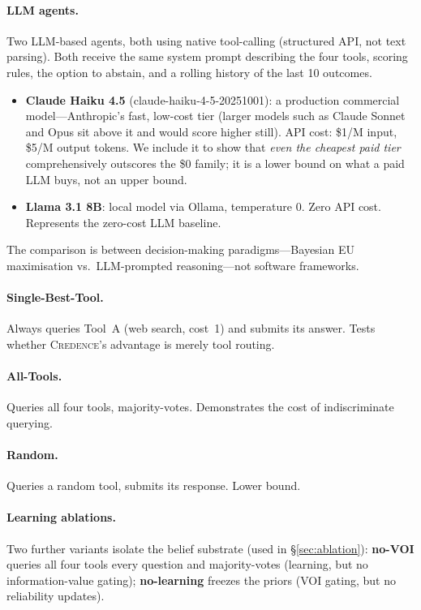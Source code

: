 \documentclass[11pt]{article}
\newcommand{\credence}{\textsc{Credence}}
\begin{document}
\paragraph{LLM agents.} Two LLM-based agents, both using native tool-calling (structured API, not text parsing). Both receive the same system prompt describing the four tools, scoring rules, the option to abstain, and a rolling history of the last 10 outcomes.
\begin{itemize}
\item \textbf{Claude Haiku 4.5} (claude-haiku-4-5-20251001): a production commercial model---Anthropic's fast, low-cost tier (larger models such as Claude Sonnet and Opus sit above it and would score higher still). API cost: \$1/M input, \$5/M output tokens. We include it to show that \emph{even the cheapest paid tier} comprehensively outscores the \$0 family; it is a lower bound on what a paid LLM buys, not an upper bound.
\item \textbf{Llama 3.1 8B}: local model via Ollama, temperature 0. Zero API cost. Represents the zero-cost LLM baseline.
\end{itemize}
The comparison is between decision-making paradigms---Bayesian EU maximisation vs.\ LLM-prompted reasoning---not software frameworks.

\paragraph{Single-Best-Tool.} Always queries Tool~A (web search, cost~1) and submits its answer. Tests whether \credence{}'s advantage is merely tool routing.

\paragraph{All-Tools.} Queries all four tools, majority-votes. Demonstrates the cost of indiscriminate querying.

\paragraph{Random.} Queries a random tool, submits its response. Lower bound.

\paragraph{Learning ablations.} Two further variants isolate the belief substrate (used in \S\ref{sec:ablation}): \textbf{no-VOI} queries all four tools every question and majority-votes (learning, but no information-value gating); \textbf{no-learning} freezes the priors (VOI gating, but no reliability updates).
\end{document}
